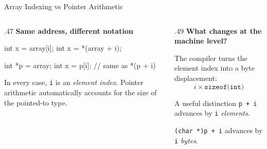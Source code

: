 \documentclass[9pt,aspectratio=169,xcolor=table]{beamer}
\begin{document}
\begin{frame}[fragile]{Array Indexing vs Pointer Arithmetic}
	\begin{columns}[T]
		\begin{column}{.47\textwidth}
			\textbf{Same address, different notation}
			\begin{cc}
	int x = array[i];
	int x = *(array + i);

	int *p = array;
	int x = p[i];   // same as *(p + i)
\end{cc}

			\vspace{2mm}
			{\small
				In every case, \texttt{i} is an \emph{element index}.
				Pointer arithmetic automatically accounts for the size
				of the pointed-to type.
			}
		\end{column}

		\begin{column}{.49\textwidth}
			\textbf{What changes at the machine level?}

			\vspace{1mm}
			{\small
				The compiler turns the element index into a byte
				displacement:
				\[
				i \times \texttt{sizeof(int)}
				\]
			}

			\vspace{2mm}

			\begin{block}{A useful distinction}
				\small
				\texttt{p + i} advances by \texttt{i} \emph{elements}.

				\vspace{1mm}

				\texttt{(char *)p + i} advances by \texttt{i} \emph{bytes}.
			\end{block}
		\end{column}
	\end{columns}

\end{frame}
\end{document}
